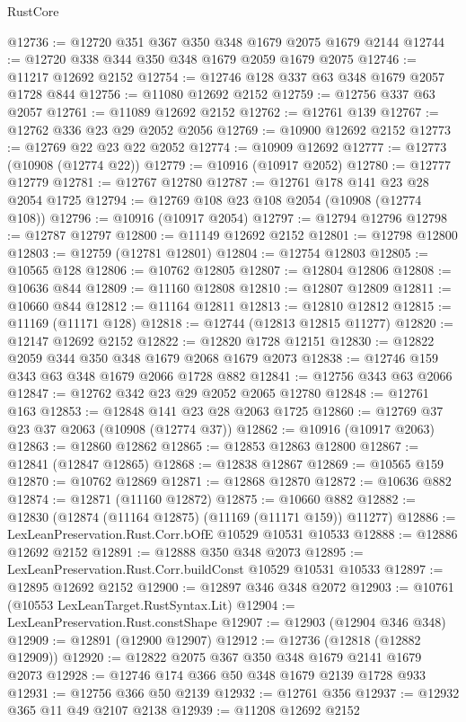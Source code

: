 \begin{lexlean}{RustCore}
\begin{coremodule}
@12736 := @12720 @351 @367 @350 @348 @1679 @2075 @1679 @2144
@12744 := @12720 @338 @344 @350 @348 @1679 @2059 @1679 @2075
@12746 := @11217 @12692 @2152
@12754 := @12746 @128 @337 @63 @348 @1679 @2057 @1728 @844
@12756 := @11080 @12692 @2152
@12759 := @12756 @337 @63 @2057
@12761 := @11089 @12692 @2152
@12762 := @12761 @139
@12767 := @12762 @336 @23 @29 @2052 @2056
@12769 := @10900 @12692 @2152
@12773 := @12769 @22 @23 @22 @2052
@12774 := @10909 @12692
@12777 := @12773 (@10908 (@12774 @22))
@12779 := @10916 (@10917 @2052)
@12780 := @12777 @12779
@12781 := @12767 @12780
@12787 := @12761 @178 @141 @23 @28 @2054 @1725
@12794 := @12769 @108 @23 @108 @2054 (@10908 (@12774 @108))
@12796 := @10916 (@10917 @2054)
@12797 := @12794 @12796
@12798 := @12787 @12797
@12800 := @11149 @12692 @2152
@12801 := @12798 @12800
@12803 := @12759 (@12781 @12801)
@12804 := @12754 @12803
@12805 := @10565 @128
@12806 := @10762 @12805
@12807 := @12804 @12806
@12808 := @10636 @844
@12809 := @11160 @12808
@12810 := @12807 @12809
@12811 := @10660 @844
@12812 := @11164 @12811
@12813 := @12810 @12812
@12815 := @11169 (@11171 @128)
@12818 := @12744 (@12813 @12815 @11277)
@12820 := @12147 @12692 @2152
@12822 := @12820 @1728 @12151
@12830 := @12822 @2059 @344 @350 @348 @1679 @2068 @1679 @2073
@12838 := @12746 @159 @343 @63 @348 @1679 @2066 @1728 @882
@12841 := @12756 @343 @63 @2066
@12847 := @12762 @342 @23 @29 @2052 @2065 @12780
@12848 := @12761 @163
@12853 := @12848 @141 @23 @28 @2063 @1725
@12860 := @12769 @37 @23 @37 @2063 (@10908 (@12774 @37))
@12862 := @10916 (@10917 @2063)
@12863 := @12860 @12862
@12865 := @12853 @12863 @12800
@12867 := @12841 (@12847 @12865)
@12868 := @12838 @12867
@12869 := @10565 @159
@12870 := @10762 @12869
@12871 := @12868 @12870
@12872 := @10636 @882
@12874 := @12871 (@11160 @12872)
@12875 := @10660 @882
@12882 := @12830 (@12874 (@11164 @12875) (@11169 (@11171 @159)) @11277)
@12886 := LexLeanPreservation.Rust.Corr.bOfE @10529 @10531 @10533
@12888 := @12886 @12692 @2152
@12891 := @12888 @350 @348 @2073
@12895 := LexLeanPreservation.Rust.Corr.buildConst @10529 @10531 @10533
@12897 := @12895 @12692 @2152
@12900 := @12897 @346 @348 @2072
@12903 := @10761 (@10553 LexLeanTarget.RustSyntax.Lit)
@12904 := LexLeanPreservation.Rust.constShape
@12907 := @12903 (@12904 @346 @348)
@12909 := @12891 (@12900 @12907)
@12912 := @12736 (@12818 (@12882 @12909))
@12920 := @12822 @2075 @367 @350 @348 @1679 @2141 @1679 @2073
@12928 := @12746 @174 @366 @50 @348 @1679 @2139 @1728 @933
@12931 := @12756 @366 @50 @2139
@12932 := @12761 @356
@12937 := @12932 @365 @11 @49 @2107 @2138
@12939 := @11208 @12692 @2152

\end{coremodule}
\end{lexlean}

